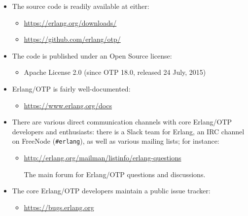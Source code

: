 \begin{itemize}

\item The source code is readily available at either:

\begin{itemize}

\item \url{https://erlang.org/downloads/}

\item \url{https://github.com/erlang/otp/}

\end{itemize}

\item The code is published under an Open Source license:

\begin{itemize}

\item Apache License 2.0 (since OTP 18.0, released 24 July, 2015)

\end{itemize}

\item Erlang/OTP is fairly well-documented:

\begin{itemize}

\item \url{https://www.erlang.org/docs}

\end{itemize}

\item There are various direct communication channels with core
Erlang/OTP developers and enthusiasts: there is a Slack team for
Erlang, an IRC channel on FreeNode (\texttt{\#erlang}), as well as
various mailing lists; for instance:

\begin{itemize}

\item \url{http://erlang.org/mailman/listinfo/erlang-questions}

The main forum for Erlang/OTP questions and discussions.

\end{itemize}

\item The core Erlang/OTP developers maintain a public issue tracker:

\begin{itemize}

\item \url{https://bugs.erlang.org}


\end{itemize}
\end{itemize}
